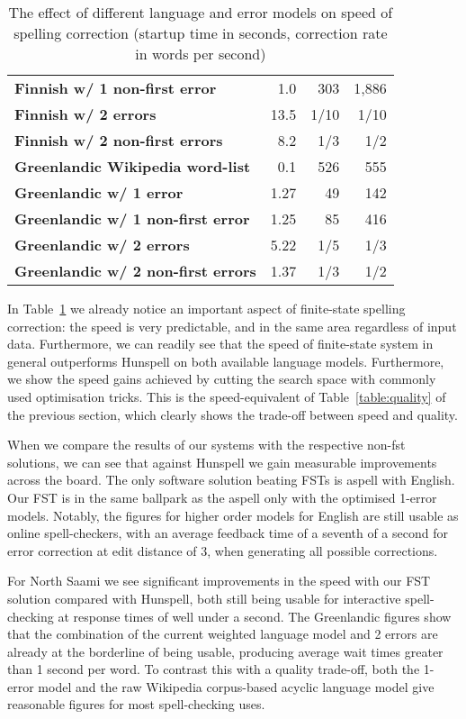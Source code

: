 \documentclass[a4paper,12pt]{article}
\begin{document}
\begin{table}
\begin{tabular}{|l|r|r|r|}
\bf Finnish w/ 1 non-first error & 1.0 & 303 & 1,886 \\
        \bf Finnish w/ 2 errors & 13.5 & 1/10 & 1/10 \\
\bf Finnish w/ 2 non-first errors & 8.2 & 1/3 & 1/2 \\
        \hline
        \bf Greenlandic Wikipedia word-list & 0.1 & 526 & 555\\
        \hline
        \bf Greenlandic w/ 1 error & 1.27 & 49 & 142 \\
\bf Greenlandic w/ 1 non-first error & 1.25 & 85 & 416 \\
       \bf Greenlandic w/ 2 errors & 5.22 & 1/5 & 1/3 \\
\bf Greenlandic w/ 2 non-first errors & 1.37 & 1/3 & 1/2 \\
        \hline
    \end{tabular}
    \caption{The effect of different language and error models on speed of
        spelling correction (startup time in seconds, correction rate in
        words per second) \label{table:speed}}
\end{table}


In Table~\ref{table:speed} we already notice an important aspect of
finite-state spelling correction: the speed is very predictable, and in the same
area regardless of input data. Furthermore, we can readily see that the speed
of finite-state system in general outperforms Hunspell on both available
language models.
Furthermore, we show the speed gains achieved by cutting the
search space with commonly used optimisation tricks. This is the
speed-equivalent of Table~\ref{table:quality} of the previous section, which
clearly shows the trade-off between speed and quality.

When we compare the results of our systems with the respective non-fst
solutions, we can see that against Hunspell we gain measurable improvements
across the board. The only software solution beating FSTs is aspell with
English. Our FST is in the same
ballpark as the aspell only with the optimised 1-error models. Notably, the
figures for higher order models for English are still usable as online
spell-checkers, with an average feedback time of a seventh of a second for
error correction at edit distance of 3, when generating all possible
corrections.

For North Saami we see significant improvements in the speed with our FST
solution compared with Hunspell, both still being usable for interactive
spell-checking at response times of well under a second. The Greenlandic
figures show that the combination of the current weighted language model and 2
errors are already at the borderline of being usable, producing average wait
times greater than 1 second per word. To contrast this with a quality
trade-off, both the 1-error model and the raw Wikipedia corpus-based
acyclic language model give reasonable figures for most spell-checking
uses.
\end{document}
